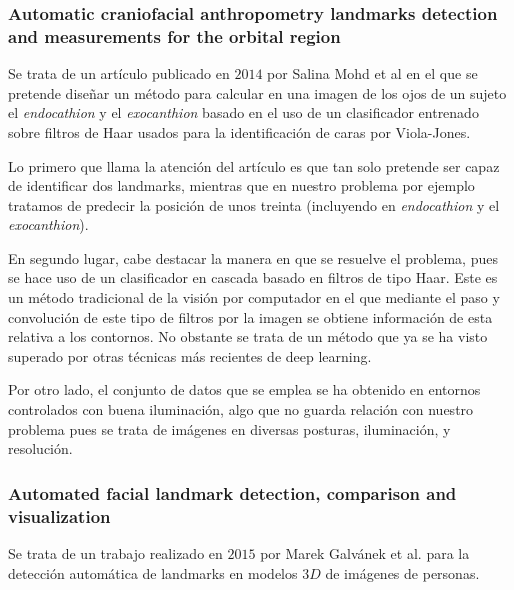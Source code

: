             \subsubsection*{Automatic craniofacial anthropometry landmarks detection and measurements for the orbital region}
                \noindent Se trata de un artículo publicado en $2014$ por Salina Mohd et al \cite{asi2014automatic} en el que se pretende diseñar un método para calcular en una imagen de los ojos de un sujeto el \textit{endocathion} y el \textit{exocanthion} basado en el uso de un clasificador entrenado sobre filtros de Haar usados para la identificación de caras por Viola-Jones.

                \medskip

                \noindent Lo primero que llama la atención del artículo es que tan solo pretende ser capaz de identificar dos landmarks, mientras que en nuestro problema por ejemplo tratamos de predecir la posición de unos treinta (incluyendo en \textit{endocathion} y el \textit{exocanthion}).

                \medskip

                \noindent En segundo lugar, cabe destacar la manera en que se resuelve el problema, pues se hace uso de un clasificador en cascada basado en filtros de tipo Haar. Este es un método tradicional de la visión por computador en el que mediante el paso y convolución de este tipo de filtros por la imagen se obtiene información de esta relativa a los contornos. No obstante se trata de un método que ya se ha visto superado por otras técnicas más recientes de deep learning.

                \medskip

                \noindent Por otro lado, el conjunto de datos que se emplea se ha obtenido en entornos controlados con buena iluminación, algo que no guarda relación con nuestro problema pues se trata de imágenes en diversas posturas, iluminación, y resolución.

            \subsubsection*{Automated facial landmark detection, comparison and visualization}
                \noindent Se trata de un trabajo realizado en $2015$ por Marek Galvánek et al. \cite{galvanek2015automated} para la detección automática de landmarks en modelos $3D$ de imágenes de personas. 

                \medskip


